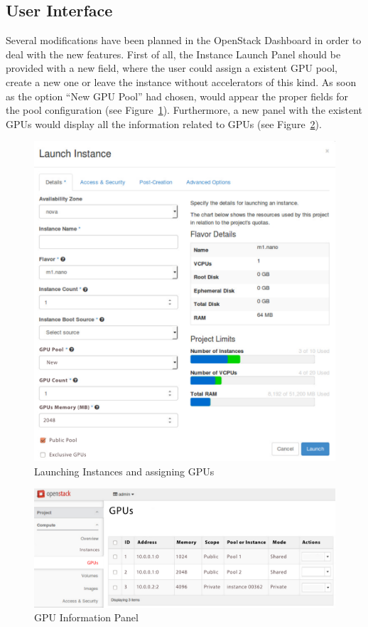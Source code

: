 \documentclass[a4paper,twoside]{article}
\begin{document}
\subsection{User Interface}
Several modifications have been planned in the OpenStack Dashboard in order to deal with the new features.
First of all, the Instance Launch Panel should be provided with a new field, where the user could assign a existent GPU pool, create a new one or leave the instance without accelerators of this kind.
As soon as the option ``New GPU Pool'' had chosen, would appear the proper fields for the pool configuration (see Figure~\ref{fig:ui-launch}).
Furthermore, a new panel with the existent GPUs would display all the information related to GPUs (see Figure~\ref{fig:ui-rgpus}).

\begin{figure}[htb]
  \centering
  \includegraphics[width=\linewidth]{images/UI-launch.pdf}
  \caption{Launching Instances and assigning GPUs}
  \label{fig:ui-launch}
\end{figure}
  
\begin{figure}[htb]
  \centering
  \includegraphics[width=\linewidth]{images/UI-rgpus.pdf}
  \caption{GPU Information Panel}
  \label{fig:ui-rgpus}
\end{figure}
\end{document}
